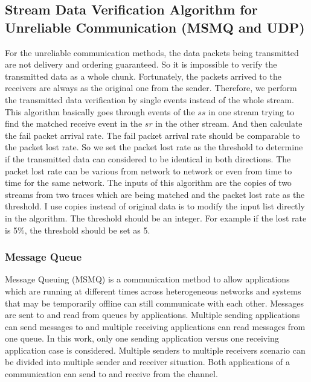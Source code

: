 \subsection{Stream Data Verification Algorithm for Unreliable Communication (MSMQ and UDP)}
For the unreliable communication methods, the data packets being transmitted are not delivery and ordering guaranteed. So it is impossible to verify the transmitted data as a whole chunk. Fortunately, the packets arrived to the receivers are always as the original one from the sender. Therefore, we perform the transmitted data verification by single events instead of the whole stream. This algorithm basically goes through events of the $ss$ in one stream trying to find the matched receive event in the $sr$ in the other stream. And then calculate the fail packet arrival rate. The fail packet arrival rate should be comparable to the packet lost rate. So we set the packet lost rate as the threshold to determine if the transmitted data can considered to be identical in both directions. The packet lost rate can be various from network to network or even from time to time for the same network. The inputs of this algorithm are the copies of two streams from two traces which are being matched and the packet lost rate as the threshold. I use copies instead of original data is to modify the input list directly in the algorithm. The threshold should be an integer. For example if the lost rate is 5\%, the threshold should be set as 5. 

\subsubsection{Message Queue}\label{msmq}
Message Queuing (MSMQ) is a communication method to allow applications which are running at different times across heterogeneous networks and systems that may be temporarily offline can still communicate with each other. Messages are sent to and read from queues by applications. Multiple sending applications can send messages to and multiple receiving applications can read messages from one queue.\cite{redkar2004pro} In this work, only one sending application versus one receiving application case is considered. Multiple senders to multiple receivers scenario can be divided into multiple sender and receiver situation. Both applications of a communication can send to and receive from the channel.

